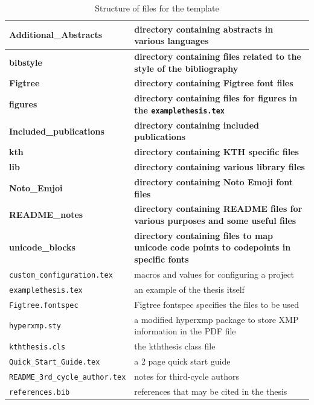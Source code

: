 \documentclass[12pt, twoside]{article}
\newcommand{\dname}[1]{\textbf{#1}}
\newcommand{\fname}[1]{\texttt{#1}}
\begin{document}
\begin{table}[!ht]
    \caption{Structure of files for the template}
    \label{tab:file_structure}
    \begin{tabular}{L{7cm}<{\footnotesize} L{6.5cm}<{\footnotesize}}
\hline
\dname{Additional\_Abstracts} & \textbf{directory containing abstracts in various languages} \\
\hline
\dname{bibstyle} & \textbf{directory containing files related to the style of the bibliography} \\
\hline
\dname{Figtree}& \textbf{directory containing Figtree font files} \\
\hline
\dname{figures} & \textbf{directory containing files for figures in the \fname{examplethesis.tex}} \\
\hline
\dname{Included\_publications} & \textbf{directory containing included publications} \\
\hline
\dname{kth} & \textbf{directory containing KTH specific files}  \\
\hline
\dname{lib} & \textbf{directory containing various library files}  \\
\hline
\dname{Noto\_Emjoi}& \textbf{directory containing Noto Emoji font files} \\
\hline
\dname{README\_notes} & \textbf{directory containing README files for various purposes and some useful files}  \\
\hline
\dname{unicode\_blocks} & \textbf{directory containing files to map unicode code points to codepoints in specific fonts}  \\
\hline
\fname{custom\_configuration.tex} & macros and values for configuring a project\\
\fname{examplethesis.tex} & an example of the thesis itself \\
\fname{Figtree.fontspec} & Figtree fontspec specifies the files to be used \\
\fname{hyperxmp.sty} & a modified hyperxmp package to store XMP information in the PDF file \\
\fname{kththesis.cls} & the kththesis class file \\
\fname{Quick\_Start\_Guide.tex} & a 2 page quick start guide\\
\fname{README\_3rd\_cycle\_author.tex} & notes for third-cycle authors\\
\fname{references.bib} & references that may be cited in the thesis \\
\end{tabular}
\end{table}
\end{document}
